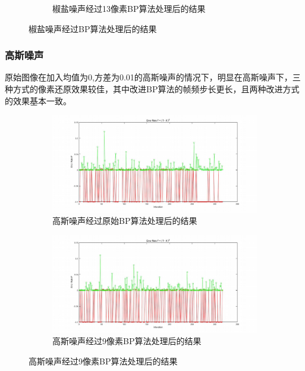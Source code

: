 \documentclass{article}
\newcounter{sub}
\begin{document}
\begin{figure}[htpb]
\begin{subfigure}[htpb]{.45\linewidth}
		\caption{椒盐噪声经过13像素BP算法处理后的结果}
		\label{fig:椒盐噪声经过13像素BP算法处理后的结果}
	\end{subfigure}
	\caption{椒盐噪声经过BP算法处理后的结果}
	\label{fig:椒盐噪声经过BP算法处理后的结果}
\end{figure}

\subsubsection{高斯噪声}%
\label{ssub:高斯噪声}

原始图像在加入均值为0,方差为0.01的高斯噪声的情况下，明显在高斯噪声下，三种方式的像素还原效果较佳，其中改进BP算法的帧频步长更长，且两种改进方式的效果基本一致。

\begin{figure}[htpb]
	\centering
	\begin{subfigure}[htpb]{.45\linewidth}
		\centering
		\includegraphics[width=\linewidth]{Gauss-5.png}
		\caption{高斯噪声经过原始BP算法处理后的结果}
		\label{fig:高斯噪声经过原始BP算法处理后的结果}
	\end{subfigure}
	\quad
	\begin{subfigure}[htpb]{.45\linewidth}
		\centering
		\includegraphics[width=\linewidth]{Gauss-9.png}
		\caption{高斯噪声经过9像素BP算法处理后的结果}
		\label{fig:高斯噪声经过9像素BP算法处理后的结果}

\end{subfigure}
\end{figure}
\end{document}
